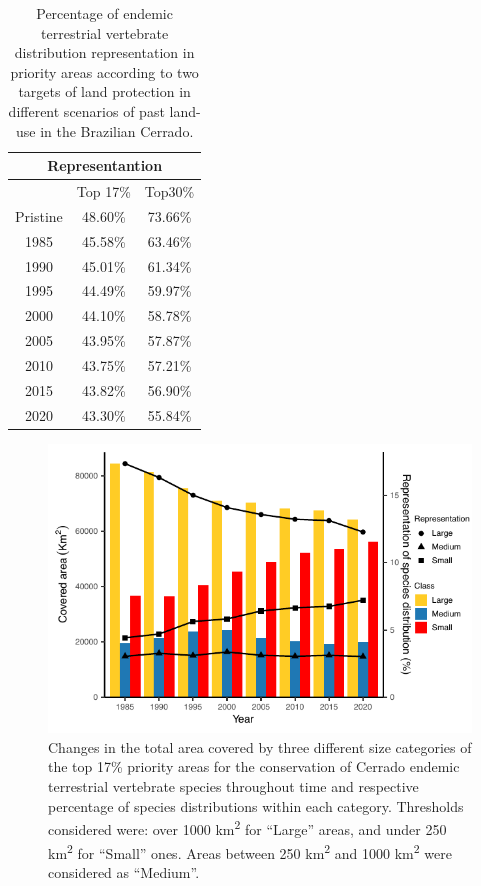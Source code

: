 \documentclass[12pt,openright,oneside,a4paper,english]{abntex2}
\begin{document}
\begin{table}[h]
	\centering
	\caption[Terrestrial vertebrate distribution representation in different land-use scenarios]{\small Percentage of endemic terrestrial vertebrate distribution representation in priority areas according to two targets of land protection in different scenarios of past land-use in the Brazilian Cerrado.}
	\label{tab:tab3-1}
	\vspace{\bigskipamount}
	\begin{tabular}{c c c}
		\hline
		\multicolumn{3}{c}{Representantion} \\
		\hline
		& Top 17\% & Top30\% \\
		\hline
		Pristine & 48.60\% & 73.66\% \\
		1985 & 45.58\% & 63.46\% \\
		1990 & 45.01\% & 61.34\% \\
		1995 & 44.49\% & 59.97\% \\
		2000 & 44.10\% & 58.78\% \\
		2005 & 43.95\% & 57.87\% \\
		2010 & 43.75\% & 57.21\% \\
		2015 & 43.82\% & 56.90\% \\
		2020 & 43.30\% & 55.84\% \\								
		\hline
	\end{tabular}
\end{table}

\begin{figure}[H]
	\centering
	\includegraphics[width=160mm]{Fig c3-3}
	\caption[Changes in the total area covered by three different size categories of the top 17\% of the Cerrado ecoregion throughout time]{\small Changes in the total area covered by three different size categories of the top 17\% priority areas for the conservation of Cerrado endemic terrestrial vertebrate species throughout time and respective percentage of species distributions within each category. Thresholds considered were: over 1000 km\textsuperscript{2} for “Large” areas, and under 250 km\textsuperscript{2} for “Small” ones. Areas between 250 km\textsuperscript{2} and 1000 km\textsuperscript{2} were considered as “Medium”.}
	\label{fig:fig3-3}
\end{figure}
\end{document}
